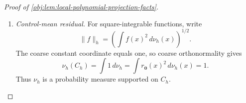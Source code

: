 \begin{proof}[Proof of \cref{obj:lem:local-polynomial-projection-facts}]
\begin{enumerate}
The coordinate bound gives, for every \(x\in\mathbb R^d\),
\[
|b_{\mathbf j,\kappa}(x)|\le\sqrt{J^d}\,4^d.
\]
The constant coordinate on a cell is
\[
b_{\mathbf j,\mathbf0}(x)=\sqrt{J^d}\,\mathbf1_{D_{\mathbf j}}(x).
\]
Consequently,
\[
|b_{\mathbf j,\kappa}(x)|
 \le\frac{4^d}{\sqrt{J^d}}b_{\mathbf j,\mathbf0}(x)^2,
\qquad
\int|b_{\mathbf j,\kappa}(x)|\,d\nu_h(x)
 \le\frac{4^d}{\sqrt{J^d}},
\]
where the second inequality uses
\(\int b_{\mathbf j,\mathbf0}^2\,d\nu_h=1\).

If \(x\in D_{\mathbf j}\), disjointness reduces the kernel to
\[
K_J(x,x')
 =\sum_{\kappa\in\mathcal U_{\mathrm{coarse}}}
 b_{\mathbf j,\kappa}(x)b_{\mathbf j,\kappa}(x').
\]
The triangle inequality and the preceding bounds therefore give
\[
\begin{aligned}
\int|K_J(x,x')|\,d\nu_h(x')
&\le
 \sum_{\kappa\in\mathcal U_{\mathrm{coarse}}}
 |b_{\mathbf j,\kappa}(x)|
 \int|b_{\mathbf j,\kappa}(x')|\,d\nu_h(x')\\
&\le q\bigl(\sqrt{J^d}\,4^d\bigr)
          \frac{4^d}{\sqrt{J^d}}
 =q(4^d)^2.
\end{aligned}
\]
For \(x\) outside all cells, \(K_J(x,x')=0\), so the same bound holds there.

There are \(|\mathcal Z_J|=J^d\) cells and \(q\) coordinates per cell;
hence the fine index set has \(qJ^d\) elements. Expanding the squared
finite kernel and factoring the product integrals yields
\[
\begin{aligned}
\iint K_J(x,x')^2\,d\nu_h(x)\,d\nu_h(x')
&=
 \sum_{\mathbf j,\kappa}\sum_{\mathbf j',\kappa'}
 \left(\int
 b_{\mathbf j,\kappa}(x)b_{\mathbf j',\kappa'}(x)\,d\nu_h(x)\right)^2\\
&=qJ^d=k.
\end{aligned}
\]
All terms are integrable by the square integrability of the basis coordinates.
Define
\[
C_{\mathrm B}
 =\max\{\sqrt q\,4^d+1,\ q(4^d)^2+1\}>0.
\]
We have proved
\[
\sup_{x\in C_h}\|r(x)\|_2\le C_{\mathrm B},
\qquad
\sup_{x\in C_h}\int|K_J(x,x')|\,d\nu_h(x')\le C_{\mathrm B},
\]
together with the exact squared-kernel identity.

\item \emph{Control-mean residual.}
For square-integrable functions, write
\[
\|f\|_h=\left(\int f(x)^2\,d\nu_h(x)\right)^{1/2}.
\]
The coarse constant coordinate equals one, so coarse orthonormality gives
\[
\nu_h(C_h)=\int1\,d\nu_h
 =\int r_{\mathbf0}(x)^2\,d\nu_h(x)=1.
\]
Thus \(\nu_h\) is a probability measure supported on \(C_h\).


\end{enumerate}
\end{proof}

